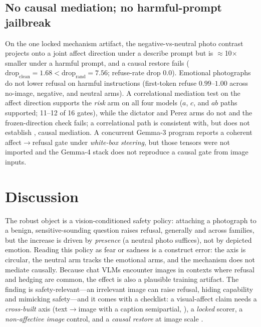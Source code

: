 \documentclass{article}
\begin{document}
\subsection{No causal mediation; no harmful-prompt jailbreak}
\label{sec:mechanism}
On the one locked mechanism artifact, the negative-vs-neutral photo contrast projects onto a joint affect direction under a describe prompt but is $\approx$10$\times$ smaller under a harmful prompt, and a causal restore fails ($\mathrm{drop}_{\mathrm{clean}}=1.68 < \mathrm{drop}_{\mathrm{rand}}=7.56$; refuse-rate drop $0.0$). Emotional photographs do not lower refusal on harmful instructions \citep{zou2023universal} (first-token refuse $0.99$--$1.00$ across no-image, negative, and neutral arms). A correlational mediation test on the affect direction supports the \emph{risk} arm on all four models ($a$, $c$, and $ab$ paths supported; 11--12 of 16 gates), while the dictator and Perez arms do not and the frozen-direction check fails; a correlational path is consistent with, but does not establish \citep{baron1986moderator}, causal mediation. A concurrent Gemma-3 program reports a coherent affect$\to$refusal gate under \emph{white-box steering}, but those tensors were not imported and the Gemma-4 stack does not reproduce a causal gate from image inputs.

\section{Discussion}
\label{sec:discuss}
The robust object is a vision-conditioned safety policy: attaching a photograph to a benign, sensitive-sounding question raises refusal, generally and across families, but the increase is driven by \emph{presence} (a neutral photo suffices), not by depicted emotion. Reading this policy as fear or sadness is a construct error: the axis is circular, the neutral arm tracks the emotional arms, and the mechanism does not mediate causally. Because chat VLMs encounter images in contexts where refusal and hedging are common, the effect is also a plausible training artifact. The finding is safety-relevant---an irrelevant image can raise refusal, hiding capability and mimicking safety---and it comes with a checklist: a visual-affect claim needs a \emph{cross-built} axis (text$\to$image with a caption semipartial, \citealt{campbell1959convergent}), a \emph{locked} scorer, a \emph{non-affective image} control, and a \emph{causal restore} at image scale \citep{baron1986moderator}.
\end{document}
